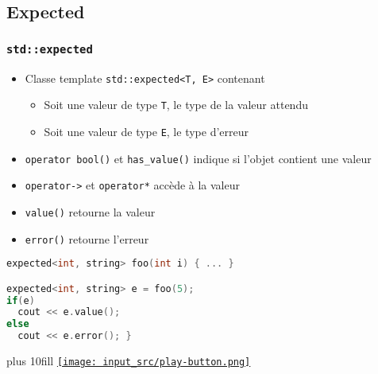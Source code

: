 \documentclass[C++.tex]{subfiles}
\begin{document}
\subsection*{Expected}
\begin{frame}[fragile]
	\frametitle{\lstinline|std::expected|}
	\begin{itemize}
		\item Classe template \lstinline|std::expected<T, E>| contenant
		\begin{itemize}
			\item Soit une valeur de type \lstinline|T|, le type de la valeur attendu
			\item Soit une valeur de type \lstinline|E|, le type d'erreur
		\end{itemize}
		\item \lstinline|operator bool()| et \lstinline|has_value()| indique si l'objet contient une valeur
		\item \lstinline|operator->| et \lstinline|operator*| accède à la valeur 
		\item \lstinline|value()| retourne la valeur
		\item \lstinline|error()| retourne l'erreur
	\end{itemize}

	\begin{lstlisting}[language=C++]
expected<int, string> foo(int i) { ... }

expected<int, string> e = foo(5);
if(e)
  cout << e.value();
else
  cout << e.error(); }\end{lstlisting}

	\vskip 5mm plus 10fill
	\hfill
	\href{https://godbolt.org/#g:!((g:!((g:!((h:codeEditor,i:(filename:'1',fontScale:14,fontUsePx:'0',j:1,lang:c%2B%2B,selection:(endColumn:1,endLineNumber:30,positionColumn:1,positionLineNumber:30,selectionStartColumn:1,selectionStartLineNumber:1,startColumn:1,startLineNumber:1),source:'%23include+%3Ciostream%3E%0A%23include+%3Cexpected%3E%0A%23include+%3Cstring%3E%0A%0Astd::expected%3Cint,+std::string%3E+foo(int+i)%0A%7B%0A++if(i+%3E+0)%0A++%7B%0A++++return+i%3B%0A++%7D%0A++else%0A++%7B%0A++++return+std::unexpected%7B%22Nul%22%7D%3B%0A++%7D%0A%7D%0A%0Aint+main()%0A%7B%0A++std::expected%3Cint,+std::string%3E+e+%3D+foo(5)%3B%0A%0A++if(e)%0A++%7B%0A++++std::cout+%3C%3C+%22Val+:+%22+%3C%3C+e.value()+%3C%3C+%22%5Cn%22%3B%0A++%7D%0A++else%0A++%7B%0A++++std::cout+%3C%3C+%22Erreur+:+%22+%3C%3C+e.error()+%3C%3C+%22%5Cn%22%3B%0A++%7D%0A%7D%0A'),l:'5',n:'0',o:'C%2B%2B+source+%231',t:'0')),k:50,l:'4',n:'0',o:'',s:0,t:'0'),(g:!((h:executor,i:(argsPanelShown:'1',compilationPanelShown:'0',compiler:g122,compilerName:'',compilerOutShown:'0',execArgs:'',execStdin:'',fontScale:14,fontUsePx:'0',j:1,lang:c%2B%2B,libs:!(),options:'-std%3Dc%2B%2B23+-Wall+-Wextra+-pedantic',source:1,stdinPanelShown:'1',wrap:'1'),l:'5',n:'0',o:'Executor+x86-64+gcc+12.2+(C%2B%2B,+Editor+%231)',t:'0')),header:(),k:50,l:'4',n:'0',o:'',s:0,t:'0')),l:'2',n:'0',o:'',t:'0')),version:4}{\texttt{[image: input\_src/play-button.png]}}
\end{frame}
\end{document}
